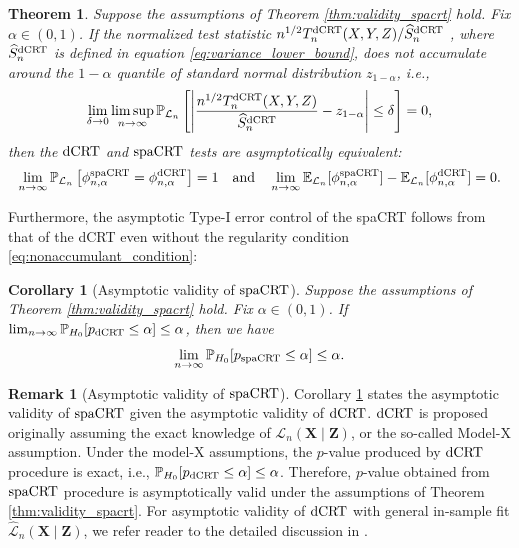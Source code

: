 \documentclass[12pt]{article}
\newtheorem{theorem}{Theorem}
\newtheorem{corollary}{Corollary}
\theoremstyle{definition}
\newtheorem{remark}{Remark}
\def\P{\mathbb{P}}
\def\P{\mathbb{P}}
\newcommand{\E}{\mathbb E}								%
\renewcommand{\P}{\mathbb{P}}							%
\newcommand{\prx}{\bm X}								%
\newcommand{\srx}{X}									%
\newcommand{\prz}{\bm Z}								%
\newcommand{\srz}{Z}									%
\newcommand{\sry}{Y}									%
\newcommand{\law}{\mathcal L}							%
\newcommand{\lawhat}{\widehat{\mathcal L}}				%
\newcommand{\dCRT}{\textnormal{dCRT}} 					%
\newcommand{\spacrt}{\textnormal{spaCRT}}               %
\begin{document}
\begin{theorem}\label{thm:asymptotic_equivalence}
	Suppose the assumptions of Theorem \ref{thm:validity_spacrt} hold. Fix $\alpha\in (0,1)$. If the normalized test statistic $n^{1/2}T_n^{\dCRT}(\srx,\sry,\srz)/\widehat{S}_n^{\dCRT}$ {\color{red}, where $\widehat{S}_n^{\dCRT}$ is defined in equation \eqref{eq:variance_lower_bound},} does not accumulate around the $1-\alpha$ quantile of standard normal distribution $z_{1-\alpha}$, i.e.,
  \begin{align}\label{eq:nonaccumulant_condition}
    \lim_{\delta\rightarrow0}\limsup_{n\rightarrow\infty}\P_{\law_n}\left[\left|\frac{n^{1/2}T_n^{\dCRT}(\srx,\sry,\srz)}{\widehat{S}_n^{\dCRT}}-z_{1-\alpha}\right|\leq \delta\right]=0,
  \end{align}
  then the $\dCRT$ and $\spacrt$ tests are asymptotically equivalent:
  \begin{align*}
    \lim_{n\rightarrow\infty}\P_{\law_n}\left[\phi_{n,\alpha}^{\spacrt}=\phi_{n,\alpha}^{\dCRT}\right]=1 \quad \text{and} \quad \lim_{n\rightarrow\infty}\E_{\law_n}[\phi_{n,\alpha}^{\spacrt}]-\E_{\law_n}[\phi_{n,\alpha}^{\dCRT}]=0.
  \end{align*}
\end{theorem}
\noindent Furthermore, the asymptotic Type-I error control of the spaCRT follows from that of the dCRT even without the regularity condition \eqref{eq:nonaccumulant_condition}:

\begin{corollary}[Asymptotic validity of $\spacrt$]\label{cor:asymptotic_validity_spacrt}
  Suppose the assumptions of Theorem \ref{thm:validity_spacrt} hold. Fix $\alpha\in (0,1)$. If $\lim_{n\rightarrow\infty}\P_{H_0}[p_{\dCRT}\leq \alpha]\leq \alpha$, then we have 
  \begin{align*}
    \lim_{n\rightarrow\infty}\P_{H_0}[p_{\spacrt}\leq \alpha]\leq \alpha.
  \end{align*}
\end{corollary}

\begin{remark}[Asymptotic validity of $\spacrt$]
	Corollary \ref{cor:asymptotic_validity_spacrt} states the asymptotic validity of $\spacrt$ given the asymptotic validity of $\dCRT$. $\dCRT$ is proposed originally assuming the exact knowledge of $\law_n(\prx\mid\prz)$, or the so-called Model-X assumption. Under the model-X assumptions, the $p$-value produced by $\dCRT$ procedure is exact, i.e., $\P_{H_0}[p_{\dCRT}\leq \alpha]\leq \alpha$. Therefore, $p$-value obtained from $\spacrt$ procedure is asymptotically valid under the assumptions of Theorem \ref{thm:validity_spacrt}. For asymptotic validity of $\dCRT$ with general in-sample fit $\lawhat_n(\prx\mid\prz)$, we refer reader to the detailed discussion in \cite{Niu2022a}.
\end{remark}
\end{document}
